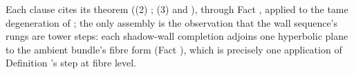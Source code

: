 Each clause cites its theorem ((2) ; (3)  and ), through Fact , applied to the tame degeneration of ; the only assembly is the observation that the wall sequence's rungs are tower steps: each shadow-wall completion adjoins one hyperbolic plane to the ambient bundle's fibre form (Fact ), which is precisely one application of Definition 's step at fibre level.
